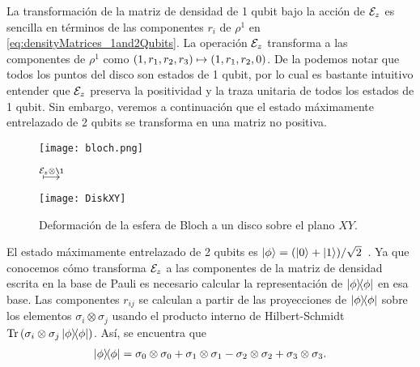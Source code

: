 La transformación de la matriz de densidad de 1 qubit bajo la acción 
de  $\mathcal{E}_z$ es sencilla en términos de las componentes $r_i$
de $\rho^1$ en \eqref{eq:densityMatrices_1and2Qubits}.
La operación $\mathcal{E}_z$ transforma a las componentes de $\rho^1$ como
$\qty(1,r_1,r_2,r_3)\mapsto\qty(1,r_1,r_2,0)$. De la 
podemos notar que todos los puntos del disco son estados de 1 qubit, por 
lo cual es bastante intuitivo entender que $\mathcal{E}_z$ preserva la positividad y 
la traza unitaria de todos los estados de 1 qubit. 
Sin embargo, veremos a continuación que el estado 
máximamente entrelazado de 2 qubits se transforma en una 
matriz no positiva.

\begin{figure}%
\centering
\begin{minipage}{.4\textwidth}
\centering
\texttt{[image: bloch.png]}
\end{minipage}
$\stackrel{\E_{z}\otimes\1 \vspace{1cm}}{\longmapsto}$
\begin{minipage}{0.4\textwidth}
\centering
\texttt{[image: DiskXY]}
\end{minipage}
\caption{
Deformación de la esfera de Bloch a un disco sobre el plano $XY$.}
\label{fig:qtm-op-motivation}
\end{figure} %

El estado máximamente entrelazado de 2 qubits es
$\ket{\phi}=\qty(\ket{0}+\ket{1})/\sqrt{2}$~\cite{bengtsson_zyczkowski_2017}.
Ya que conocemos cómo transforma $\mathcal{E}_z$ a las componentes de 
la matriz de densidad escrita en la base de Pauli es necesario calcular 
la representación de $\dyad{\phi}{\phi}$ en esa base.
Las componentes $r_{ij}$ se calculan a partir de las
proyecciones de $\dyad{\phi}{\phi}$ sobre los elementos 
$\sigma_i\otimes\sigma_j$ usando el producto interno
de Hilbert-Schmidt $\Tr\qty(\pauli{i}{j}\dyad{\phi}{\phi})$.
Así, se encuentra que
\begin{align}
\dyad{\phi}{\phi}=
\pauli{0}{0}+\pauli{1}{1}-\pauli{2}{2}+\pauli{3}{3}.
\end{align}

